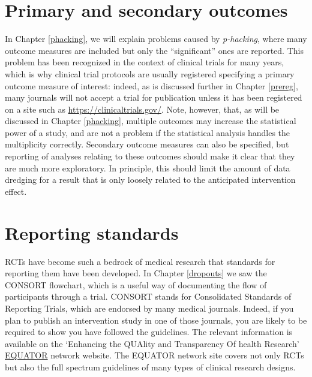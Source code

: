 \documentclass{krantz}
\begin{document}
\hypertarget{primary-and-secondary-outcomes}{%
\section{Primary and secondary outcomes}\label{primary-and-secondary-outcomes}}

In Chapter \ref{phacking}, we will explain problems caused by \emph{p-hacking}, where many outcome measures are included but only the ``significant'' ones are reported. This problem has been recognized in the context of clinical trials for many years, which is why clinical trial protocols are usually registered specifying a primary outcome measure of interest: indeed, as is discussed further in Chapter \ref{prereg}, many journals will not accept a trial for publication unless it has been registered on a site such as \url{https://clinicaltrials.gov/}. Note, however, that, as will be discussed in Chapter \ref{phacking}, multiple outcomes may increase the statistical power of a study, and are not a problem if the statistical analysis handles the multiplicity correctly. Secondary outcome measures can also be specified, but reporting of analyses relating to these outcomes should make it clear that they are much more exploratory. In principle, this should limit the amount of data dredging for a result that is only loosely related to the anticipated intervention effect.

\hypertarget{reporting-standards}{%
\section{Reporting standards}\label{reporting-standards}}

RCTs have become such a bedrock of medical research that standards for reporting them have been developed. In Chapter \ref{dropouts} we saw the CONSORT flowchart, which is a useful way of documenting the flow of participants through a trial. CONSORT stands for Consolidated Standards of Reporting Trials, which are endorsed by many medical journals. Indeed, if you plan to publish an intervention study in one of those journals, you are likely to be required to show you have followed the guidelines. The relevant information is available on the `Enhancing the QUAlity and Transparency Of health Research' \href{http://www.equator-network.org}{EQUATOR} network website. The EQUATOR network site covers not only RCTs but also the full spectrum guidelines of many types of clinical research designs.
\end{document}
